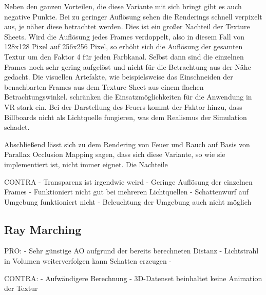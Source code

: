 Neben den ganzen Vorteilen, die diese Variante mit sich bringt gibt es auch negative Punkte. Bei zu geringer Auflösung sehen die Renderings schnell
verpixelt aus, je näher diese betrachtet werden. Dies ist ein großer Nachteil der Texture Sheets. Wird die Auflösung jedes Frames verdoppelt, also in diesem 
Fall von 128x128 Pixel auf 256x256 Pixel, so erhöht sich die Auflösung der gesamten Textur um den Faktor 4 für jeden Farbkanal. Selbst dann sind
die einzelnen Frames noch sehr gering aufgelöst und nicht für die Betrachtung aus der Nähe gedacht. 
Die visuellen Artefakte, wie beispielsweise das Einschneiden der benachbarten Frames aus dem Texture Sheet aus einem flachen Betrachtungswinkel. 
schränken die Einsatzmöglichkeiten für die Anwendung in VR stark ein. 
Bei der Darstellung des Feuers kommt der Faktor hinzu, dass Billboards nicht als Lichtquelle fungieren, was dem Realismus der Simulation schadet. 

Abschließend lässt sich zu dem Rendering von Feuer und Rauch auf Basis von Parallax Occlusion Mapping sagen, dass sich diese Variante, so wie sie implementiert
ist, nicht immer eignet. Die Nachteile 



CONTRA\newline
- Transparenz ist irgendwie weird\newline
- Geringe Auflösung der einzelnen Frames \newline
- Funktioniert nicht gut bei mehreren Lichtquellen\newline
- Schattenwurf auf Umgebung funktioniert nicht\newline
- Beleuchtung der  Umgebung auch nicht möglich\newline




\subsection{Ray Marching}
\label{sec:5.2}

PRO: \newline
- Sehr günstige AO aufgrund der bereits berechneten Distanz\newline
- Lichtstrahl in Volumen weiterverfolgen kann Schatten erzeugen\newline
- 

CONTRA: \newline
- Aufwändigere Berechnung\newline
- 3D-Datenset beinhaltet keine Animation der Textur\newline




